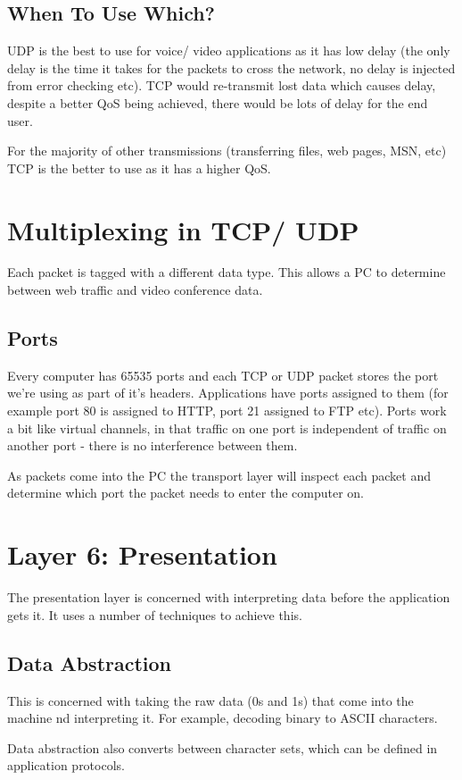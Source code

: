 \subsection{When To Use Which?}
UDP is the best to use for voice/ video applications as it has low delay (the only delay is the time it takes for the packets to cross the network, no delay is injected from error checking etc). TCP would re-transmit lost data which causes delay, despite a better QoS being achieved, there would be lots of delay for the end user.

For the majority of other transmissions (transferring files, web pages, MSN, etc) TCP is the better to use as it has a higher QoS. 

\section{Multiplexing in TCP/ UDP}
Each packet is tagged with a different data type. This allows a PC to determine between web traffic and video conference data.
\subsection{Ports}
Every computer has 65535 ports and each TCP or UDP packet stores the port we're using as part of it's headers. Applications have ports assigned to them (for example port 80 is assigned to HTTP, port 21 assigned to FTP etc). Ports work a bit like virtual channels, in that traffic on one port is independent of traffic on another port - there is no interference between them. 

As packets come into the PC the transport layer will inspect each packet and determine which port the packet needs to enter the computer on.

\section{Layer 6: Presentation}
The presentation layer is concerned with interpreting data before the application gets it. It uses a number of techniques to achieve this.
\subsection{Data Abstraction}
This is concerned with taking the raw data (0s and 1s) that come into the machine nd interpreting it. For example, decoding binary to ASCII characters. 

Data abstraction also converts between character sets, which can be defined in application protocols.

